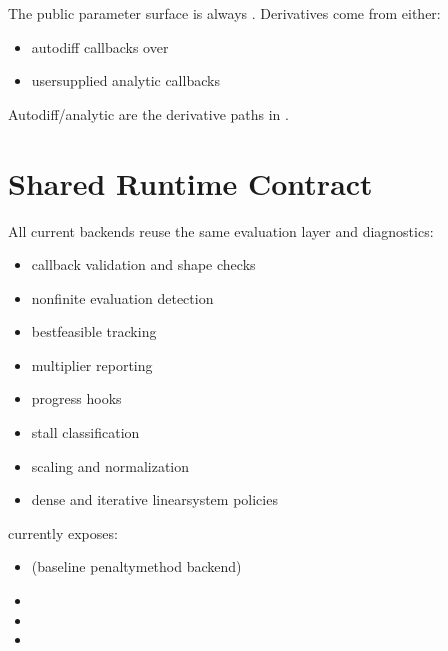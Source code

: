 \documentclass[letterpaper,10pt,english]{sphinxmanual}
\begin{document}
\sphinxAtStartPar
The public parameter surface is always . Derivatives come from either:
\begin{itemize}
\item {} 
\sphinxAtStartPar
autodiff callbacks over 

\item {} 
\sphinxAtStartPar
user\sphinxhyphen{}supplied analytic callbacks

\end{itemize}

\sphinxAtStartPar
Autodiff/analytic are the derivative paths in .


\section{Shared Runtime Contract}
\label{\detokenize{optima_algorithms:shared-runtime-contract}}
\sphinxAtStartPar
All current backends reuse the same evaluation layer and diagnostics:
\begin{itemize}
\item {} 
\sphinxAtStartPar
callback validation and shape checks

\item {} 
\sphinxAtStartPar
non\sphinxhyphen{}finite evaluation detection

\item {} 
\sphinxAtStartPar
best\sphinxhyphen{}feasible tracking

\item {} 
\sphinxAtStartPar
multiplier reporting

\item {} 
\sphinxAtStartPar
progress hooks

\item {} 
\sphinxAtStartPar
stall classification

\item {} 
\sphinxAtStartPar
scaling and normalization

\item {} 
\sphinxAtStartPar
dense and iterative linear\sphinxhyphen{}system policies

\end{itemize}

\sphinxAtStartPar
{} currently exposes:
\begin{itemize}
\item {} 
\sphinxAtStartPar
{} (baseline penalty\sphinxhyphen{}method backend)

\item {} 
\sphinxAtStartPar
{}

\item {} 
\sphinxAtStartPar
{}

\item {} 
\sphinxAtStartPar
{}

\end{itemize}
\end{document}
